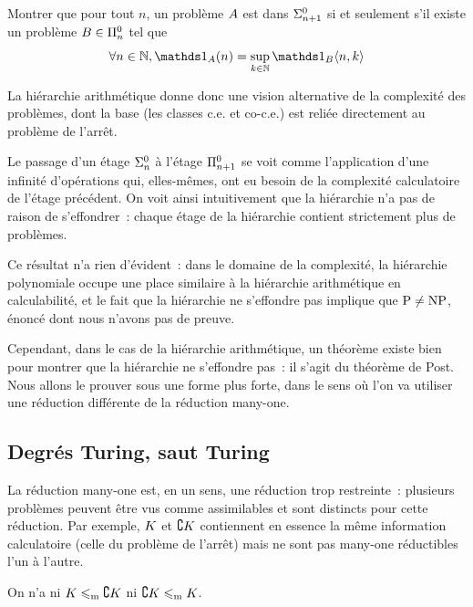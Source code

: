 \begin{exercise}
  Montrer que pour tout $n$, un problème $A$ est dans $\Sigma^0_{n+1}$ si
  et seulement s'il existe un problème $B \in \Pi^0_{n}$ tel que
  \[\forall n \in \bN, \indicP{\varPt}(n) =
  \sup_{k \in \bN} \indicP{\varPtB}\langle n,k\rangle\]
\end{exercise}

La hiérarchie arithmétique donne donc une vision alternative de la complexité
des problèmes, dont la base (les classes c.e. et co-c.e.) est reliée directement
au problème de l'arrêt.

Le passage d'un étage $\Sigma^0_{n}$ à l'étage $\Pi^0_{n+1}$ se voit comme
l'application d'une infinité d'opérations qui, elles-mêmes, ont eu besoin de
la complexité calculatoire de l'étage précédent. On voit ainsi intuitivement que
la hiérarchie n'a pas de raison de s'effondrer~: chaque étage de la hiérarchie
contient strictement plus de problèmes.

Ce résultat n'a rien d'évident~: dans le domaine de la complexité, la
hiérarchie polynomiale occupe une place similaire à la hiérarchie arithmétique
en calculabilité, et le fait que la hiérarchie ne s'effondre pas implique que
$\operatorname{P} \neq \operatorname{NP}$, énoncé dont nous n'avons pas de preuve.

Cependant, dans le cas de la hiérarchie arithmétique, un théorème existe bien
pour montrer que la hiérarchie ne s'effondre pas~: il s'agit du théorème de
Post. Nous allons le prouver sous une forme plus forte, dans le sens où l'on va
utiliser une réduction différente de la réduction many-one.

\subsection{Degrés Turing, saut Turing}

La réduction many-one est, en un sens, une réduction trop restreinte~: plusieurs
problèmes peuvent être vus comme assimilables et sont distincts pour cette
réduction. Par exemple, $K$ et $\complement K$ contiennent en essence la
même information calculatoire (celle du problème de l'arrêt) mais ne sont pas
many-one réductibles l'un à l'autre.

\begin{proposition}
  On n'a ni $K \leqslant_{\mathrm{m}} \complement K$ ni $\complement K \leqslant_{\mathrm{m}} K$.
\end{proposition}

